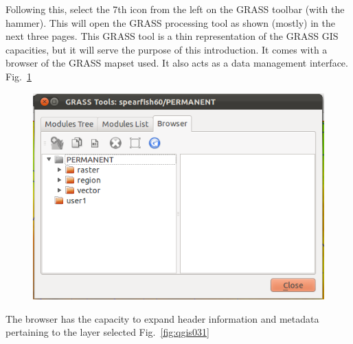 Following this, select the 7th icon from the left on
the GRASS toolbar (with the hammer). This will open the GRASS processing tool as shown
(mostly) in the next three pages. This GRASS tool is a thin
representation of the GRASS GIS capacities, but it will serve the
purpose of this introduction. It comes with a browser of the GRASS
mapset used. It also acts as a data management interface. Fig.~\ref{fig:qgis030}

\begin{figure}[htbp]
   \centering
   \includegraphics[scale=0.4]{qgis030.png}
   \caption{}
   \label{fig:qgis030}
\end{figure}

The browser has the capacity to expand header information and metadata
pertaining to the layer selected Fig.~\ref{fig:qgis031}

